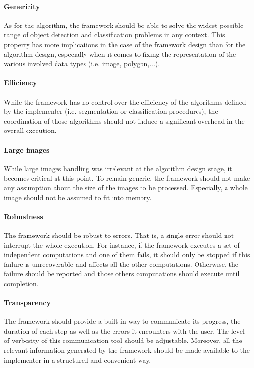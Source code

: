 \paragraph{Genericity} As for the algorithm, the framework should be able to solve the widest possible range of object detection and classification problems in any context. This property has more implications in the case of the framework design than for the algorithm design, especially when it comes to fixing the representation of the various involved data types (i.e. image, polygon,...).

\paragraph{Efficiency} While the framework has no control over the efficiency of the algorithms defined by the implementer (i.e. segmentation or classification procedures), the coordination of those algorithms should not induce a significant overhead in the overall execution. 

\paragraph{Large images} While large images handling was irrelevant at the algorithm design stage, it becomes critical at this point. To remain generic, the framework should not make any assumption about the size of the images to be processed. Especially, a whole image should not be assumed to fit into memory.

\paragraph{Robustness} The framework should be robust to errors. That is, a single error should not interrupt the whole execution. For instance, if the framework executes a set of independent computations and one of them fails, it should only be stopped if this failure is unrecoverable and affects all the other computations. Otherwise, the failure should be reported and those others computations should execute until completion. 

\paragraph{Transparency} The framework should provide a built-in way to communicate its progress, the duration of each step as well as the errors it encounters with the user. The level of verbosity of this communication tool should be adjustable. Moreover, all the relevant information generated by the framework should be made available to the implementer in a structured and convenient way.

